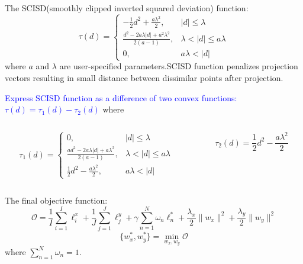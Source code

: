 \documentclass{beamer}
\begin{document}
\begin{CJK*}{UTF8}{gbsn}
\begin{frame}[allowframebreaks]
The SCISD(smoothly clipped inverted squared deviation) function:
\begin{displaymath}
\tau(d)=
  \begin{cases}
    -\frac{1}{2}d^2+\frac{a\lambda^2}{2}, & |d|\leq\lambda \\
    \frac{d^2-2a\lambda|d|+a^2\lambda^2}{2(a-1)}, & \lambda<|d|\leq a\lambda \\
    0, & a\lambda<|d|
  \end{cases}
\end{displaymath}
where $a$ and $\lambda$ are user-specified parameters.SCISD function penalizes projection vectors resulting in small distance between dissimilar points after projection.

\textcolor{blue}{Express SCISD function as a difference of two convex functions:$\tau(d)=\tau_1(d)-\tau_2(d)$} where
\begin{columns}
\begin{column}{0.6\textwidth}
\begin{displaymath}
\tau_1(d)=
\begin{cases}
0,& |d|\leq\lambda\\
\frac{ad^2-2a\lambda|d|+a\lambda^2}{2(a-1)},& \lambda<|d|\leq a\lambda\\
\frac{1}{2}d^2-\frac{a\lambda^2}{2},& a\lambda<|d|
\end{cases}
\end{displaymath}
\end{column}
\begin{column}{0.4\textwidth}
\[
\tau_2(d)=\frac{1}{2}d^2-\frac{a\lambda^2}{2}
\]
\end{column}
\end{columns}

The final objective function:
\begin{displaymath}
\mathcal{O}=\frac{1}{I}\sum_{i=1}^I\ell_i^x+\frac{1}{J}\sum_{j=1}^J\ell_j^y+\gamma\sum_{n=1}^N\omega_n\ell_n^\ast+\frac{\lambda_x}{2}\|w_x\|^2+\frac{\lambda_y}{2}\|w_y\|^2
\end{displaymath}
\begin{displaymath}
\{w_x^\ast,w_y^\ast\}=\min_{w_x,w_y}\mathcal{O}
\end{displaymath}
where $\sum_{n=1}^N\omega_n=1$.
\end{frame}


\end{CJK*}
\end{document}
